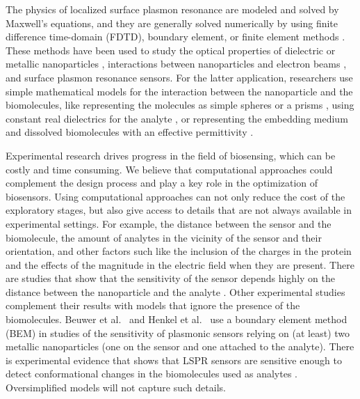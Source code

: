 The physics of localized surface plasmon resonance are modeled and solved by Maxwell's equations, and they are generally solved numerically 
by using finite difference time-domain (FDTD), boundary element, or finite element methods \cite{SolisTaboadaObelleiroLiz-MaarzanGarciadeabajo2014}.
These methods have been used to study the optical properties of dielectric or metallic nanoparticles \cite{Hohenester2018,HohenesterTrugler2012,
JungPedersenSondergaardPedersenLarsenNielsen2010, VideenSun2003,MayergoyzFredkinZhang2005, MayergoyzZhang2007}, interactions between nanoparticles
and electron beams \cite{GarciadeabajoAizpurua1997, GarciadeabajoHowie2002}, and surface plasmon resonance sensors. For the latter application, 
researchers use simple mathematical models for the interaction between the nanoparticle and the biomolecules, like representing the molecules as simple 
spheres \cite{DavisGomezVernon2010,AntosiewiczApellClaudioKall2011, SantiagoCordobaETal2011, ShenETal2013, UngerETal2009} or a prisms \cite{DanHu2014}, using 
constant real dielectrics for the analyte \cite{NghiemETal2012, SantiagoCordobaETal2011, ShenETal2013, UngerETal2009}, or representing the embedding medium 
and dissolved biomolecules with an effective permittivity \cite{JungCampbellChinowskyMarYee1998,WilletsVandyune2007,PhanETal2013}.

Experimental research drives progress in the field of biosensing, which can be costly and time consuming. We believe that 
computational approaches could complement the design process and play a key role in the optimization of biosensors. Using computational approaches
can not only reduce the cost of the exploratory stages, but also give access to details that are not always available in experimental settings. For example, 
the distance between the sensor and the biomolecule, the amount of analytes in the vicinity of the sensor and their orientation, and other factors such like
the inclusion of the charges in the protein and the effects of the magnitude in the electric field when they are present. There are studies that show that 
the sensitivity of the sensor depends highly on the distance between the nanoparticle and the analyte \cite{HaesETal2004}. Other experimental studies complement
their results with models that ignore the presence of the biomolecules. Beuwer et al.~\cite{BeuwervanHoofZijlstra2018} and Henkel et al.~\cite{HenkelETal2018} 
use a boundary element method (BEM) in studies of the sensitivity of plasmonic sensors relying on (at least) two metallic nanoparticles 
(one on the sensor and one attached to the analyte). There is experimental evidence that shows that LSPR sensors are sensitive enough to detect conformational
changes in the biomolecules used as analytes \cite{HallETal2011}. Oversimplified models will not capture such details. 

